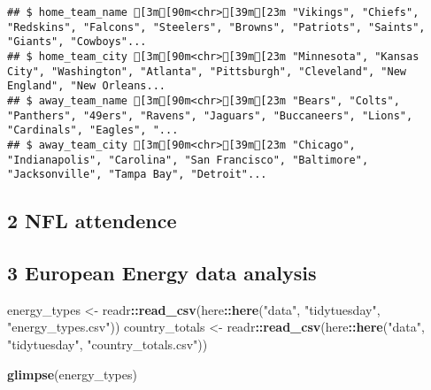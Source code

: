 \documentclass[
]{article}
\newenvironment{Shaded}{\begin{snugshade}}{\end{snugshade}}
\newcommand{\KeywordTok}[1]{\textcolor[rgb]{0.13,0.29,0.53}{\textbf{#1}}}
\newcommand{\NormalTok}[1]{#1}
\newcommand{\OperatorTok}[1]{\textcolor[rgb]{0.81,0.36,0.00}{\textbf{#1}}}
\newcommand{\StringTok}[1]{\textcolor[rgb]{0.31,0.60,0.02}{#1}}
\begin{document}
\begin{verbatim}
## $ home_team_name [3m[90m<chr>[39m[23m "Vikings", "Chiefs", "Redskins", "Falcons", "Steelers", "Browns", "Patriots", "Saints", "Giants", "Cowboys"...
## $ home_team_city [3m[90m<chr>[39m[23m "Minnesota", "Kansas City", "Washington", "Atlanta", "Pittsburgh", "Cleveland", "New England", "New Orleans...
## $ away_team_name [3m[90m<chr>[39m[23m "Bears", "Colts", "Panthers", "49ers", "Ravens", "Jaguars", "Buccaneers", "Lions", "Cardinals", "Eagles", "...
## $ away_team_city [3m[90m<chr>[39m[23m "Chicago", "Indianapolis", "Carolina", "San Francisco", "Baltimore", "Jacksonville", "Tampa Bay", "Detroit"...
\end{verbatim}

\hypertarget{nfl-attendence}{%
\subsection{2 NFL attendence}\label{nfl-attendence}}

\hypertarget{european-energy-data-analysis}{%
\subsection{3 European Energy data
analysis}\label{european-energy-data-analysis}}

\begin{Shaded}
\begin{Highlighting}[]
\NormalTok{energy_types <-}\StringTok{ }\NormalTok{readr}\OperatorTok{::}\KeywordTok{read_csv}\NormalTok{(here}\OperatorTok{::}\KeywordTok{here}\NormalTok{(}\StringTok{"data"}\NormalTok{, }\StringTok{"tidytuesday"}\NormalTok{, }\StringTok{"energy_types.csv"}\NormalTok{))}
\NormalTok{country_totals <-}\StringTok{ }\NormalTok{readr}\OperatorTok{::}\KeywordTok{read_csv}\NormalTok{(here}\OperatorTok{::}\KeywordTok{here}\NormalTok{(}\StringTok{"data"}\NormalTok{, }\StringTok{"tidytuesday"}\NormalTok{, }\StringTok{"country_totals.csv"}\NormalTok{))}

\KeywordTok{glimpse}\NormalTok{(energy_types)}
\end{Highlighting}
\end{Shaded}
\end{document}
